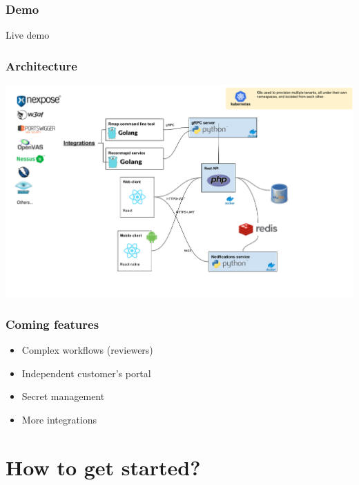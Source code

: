 \documentclass{beamer}
\begin{document}
\begin{frame}
	\frametitle{Demo}
	
	\begin{center}
	\huge{Live demo}
	\end{center}
\end{frame}


\begin{frame}
	\frametitle{Architecture}

	\includegraphics[width=\textwidth]{images/reconmap-architecture.png}
\end{frame}


\begin{frame}
	\frametitle{Coming features}
	
	\begin{itemize}
		\item Complex workflows (reviewers)
		\item Independent customer's portal
		\item Secret management
		\item More integrations
	\end{itemize}
\end{frame}

\section{How to get started?}
\end{document}
